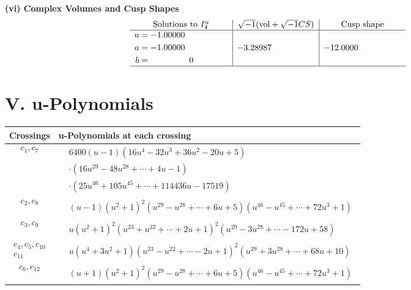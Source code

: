 \documentclass[1p]{elsarticle_modified}
\theoremstyle{definition}
\newcommand{\I}{\sqrt{-1}}
\begin{document}
\newpage\flushleft \textbf{(vi) Complex Volumes and Cusp Shapes}
$$\begin{array}{c|c|c}  
\text{Solutions to }I^u_{4}& \I (\text{vol} + \sqrt{-1}CS) & \text{Cusp shape}\\
 \hline 
\begin{aligned}
u &= -1.00000\phantom{ +0.000000I} \\
a &= -1.00000\phantom{ +0.000000I} \\
b &= \phantom{-0.000000 } 0\end{aligned}
 & -3.28987\phantom{ +0.000000I} & -12.0000\phantom{ +0.000000I}\\
 \hline 
 \end{array}$$\newpage
\newpage\renewcommand{\arraystretch}{1}
\centering \section*{ V. u-Polynomials}
\begin{tabular}{m{50pt}|m{274pt}}
Crossings & \hspace{64pt}u-Polynomials at each crossing \\
\hline $$\begin{aligned}c_{1},c_{7}\end{aligned}$$&$\begin{aligned}
&6400(u-1)(16 u^4-32 u^3+36 u^2-20 u+5)\\
&\cdot(16 u^{29}-48 u^{28}+\cdots+4 u-1)\\
&\cdot(25 u^{46}+105 u^{45}+\cdots+114436 u-17519)
\end{aligned}$\\
\hline $$\begin{aligned}c_{2},c_{8}\end{aligned}$$&$\begin{aligned}
&(u-1)(u^2+1)^2(u^{29}- u^{28}+\cdots+6 u+5)(u^{46}-u^{45}+\cdots+72 u^{3}+1)
\end{aligned}$\\
\hline $$\begin{aligned}c_{3},c_{9}\end{aligned}$$&$\begin{aligned}
&u(u^2+1)^2(u^{23}+u^{22}+\cdots+2 u+1)^{2}(u^{29}-3 u^{28}+\cdots-172 u+58)
\end{aligned}$\\
\hline $$\begin{aligned}c_{4},c_{5},c_{10}\\c_{11}\end{aligned}$$&$\begin{aligned}
&u(u^4+3 u^2+1)(u^{23}- u^{22}+\cdots-2 u+1)^{2}(u^{29}+3 u^{28}+\cdots+68 u+10)
\end{aligned}$\\
\hline $$\begin{aligned}c_{6},c_{12}\end{aligned}$$&$\begin{aligned}
&(u+1)(u^2+1)^2(u^{29}- u^{28}+\cdots+6 u+5)(u^{46}-u^{45}+\cdots+72 u^{3}+1)
\end{aligned}$\\
\hline
\end{tabular}\newpage\renewcommand{\arraystretch}{1}
\end{document}
